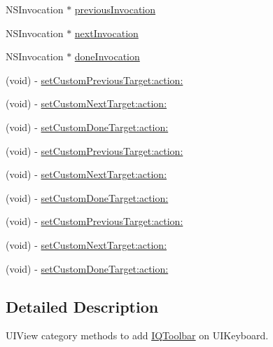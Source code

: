  \begin{DoxyCompactItemize}
\item 
N\+S\+Invocation $\ast$ \mbox{\hyperlink{category_u_i_view_07_i_q_toolbar_addition_08_a1284f959840a7672fe7365defcc773c1}{previous\+Invocation}}
\item 
N\+S\+Invocation $\ast$ \mbox{\hyperlink{category_u_i_view_07_i_q_toolbar_addition_08_a353302e401086e72c926aa184febccfa}{next\+Invocation}}
\item 
N\+S\+Invocation $\ast$ \mbox{\hyperlink{category_u_i_view_07_i_q_toolbar_addition_08_ae63e4b1f34c71edcd386b77971824a30}{done\+Invocation}}
\item 
(void) -\/ \mbox{\hyperlink{category_u_i_view_07_i_q_toolbar_addition_08_a7170d976e22d5df5621b45bbebf52a67}{set\+Custom\+Previous\+Target\+:action\+:}}
\item 
(void) -\/ \mbox{\hyperlink{category_u_i_view_07_i_q_toolbar_addition_08_a37641999d83dba30e056e0fc815d0c98}{set\+Custom\+Next\+Target\+:action\+:}}
\item 
(void) -\/ \mbox{\hyperlink{category_u_i_view_07_i_q_toolbar_addition_08_ae58dae661619a3fb91490e952851a0e6}{set\+Custom\+Done\+Target\+:action\+:}}
\item 
(void) -\/ \mbox{\hyperlink{category_u_i_view_07_i_q_toolbar_addition_08_a7170d976e22d5df5621b45bbebf52a67}{set\+Custom\+Previous\+Target\+:action\+:}}
\item 
(void) -\/ \mbox{\hyperlink{category_u_i_view_07_i_q_toolbar_addition_08_a37641999d83dba30e056e0fc815d0c98}{set\+Custom\+Next\+Target\+:action\+:}}
\item 
(void) -\/ \mbox{\hyperlink{category_u_i_view_07_i_q_toolbar_addition_08_ae58dae661619a3fb91490e952851a0e6}{set\+Custom\+Done\+Target\+:action\+:}}
\item 
(void) -\/ \mbox{\hyperlink{category_u_i_view_07_i_q_toolbar_addition_08_a7170d976e22d5df5621b45bbebf52a67}{set\+Custom\+Previous\+Target\+:action\+:}}
\item 
(void) -\/ \mbox{\hyperlink{category_u_i_view_07_i_q_toolbar_addition_08_a37641999d83dba30e056e0fc815d0c98}{set\+Custom\+Next\+Target\+:action\+:}}
\item 
(void) -\/ \mbox{\hyperlink{category_u_i_view_07_i_q_toolbar_addition_08_ae58dae661619a3fb91490e952851a0e6}{set\+Custom\+Done\+Target\+:action\+:}}
\end{DoxyCompactItemize}


\subsection{Detailed Description}
U\+I\+View category methods to add \mbox{\hyperlink{interface_i_q_toolbar}{I\+Q\+Toolbar}} on U\+I\+Keyboard. 

